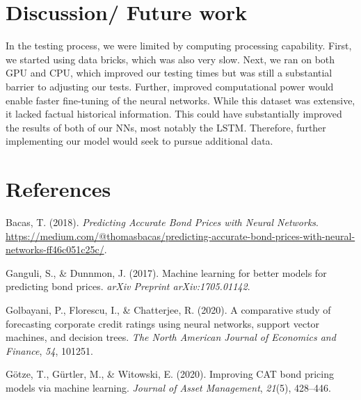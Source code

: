 \documentclass[
  man]{apa6}
\newlength{\cslhangindent}
\newlength{\cslentryspacingunit} %
\newenvironment{CSLReferences}[2] %
 {%
  \setlength{\parindent}{0pt}
  \ifodd #1
  \let\oldpar\par
  \def\par{\hangindent=\cslhangindent\oldpar}
  \fi
  \setlength{\parskip}{#2\cslentryspacingunit}
 }%
 {}
\begin{document}
\hypertarget{discussion-future-work}{%
\section{Discussion/ Future work}\label{discussion-future-work}}

In the testing process, we were limited by computing processing capability. First, we started using data bricks, which was also very slow. Next, we ran on both GPU and CPU, which improved our testing times but was still a substantial barrier to adjusting our tests. Further, improved computational power would enable faster fine-tuning of the neural networks.
While this dataset was extensive, it lacked factual historical information. This could have substantially improved the results of both of our NNs, most notably the LSTM. Therefore, further implementing our model would seek to pursue additional data.

\newpage

\hypertarget{references}{%
\section{References}\label{references}}

\hypertarget{refs}{}
\begin{CSLReferences}{1}{0}
\leavevmode{}%
Bacas, T. (2018). \emph{{Predicting Accurate Bond Prices with Neural Networks}}. \url{https://medium.com/@thomasbacas/predicting-accurate-bond-prices-with-neural-networks-ff46c051c25c/}.

\leavevmode{}%
Ganguli, S., \& Dunnmon, J. (2017). Machine learning for better models for predicting bond prices. \emph{arXiv Preprint arXiv:1705.01142}.

\leavevmode{}%
Golbayani, P., Florescu, I., \& Chatterjee, R. (2020). A comparative study of forecasting corporate credit ratings using neural networks, support vector machines, and decision trees. \emph{The North American Journal of Economics and Finance}, \emph{54}, 101251.

\leavevmode{}%
Götze, T., Gürtler, M., \& Witowski, E. (2020). Improving CAT bond pricing models via machine learning. \emph{Journal of Asset Management}, \emph{21}(5), 428--446.

\end{CSLReferences}
\end{document}
